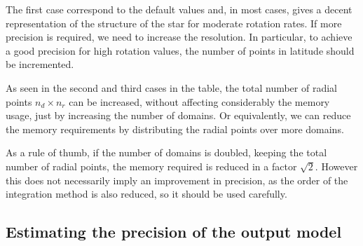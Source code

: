 The first case correspond to the default values and, in most cases, 
gives a decent representation of the structure of the star for moderate rotation rates.
If more precision is required, we need to increase the resolution. In particular, to
achieve a good precision for high rotation values, the number of points in latitude should
be incremented. 

As seen in the second and third cases in the table, the total number of radial points $n_d\times n_r$ can be 
increased, without affecting considerably the memory usage, just by increasing the number of domains.
Or equivalently, we can reduce the memory requirements by distributing the radial points over
more domains. 

As a rule of thumb, if the number of domains is doubled, keeping the total number of
radial points, the memory required is reduced in a factor $\sqrt{2}$. However this does not
necessarily imply an improvement in precision, as the order of the integration method is also reduced,
so it should be used carefully.

\subsection{Estimating the precision of the output model}

